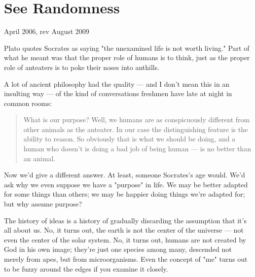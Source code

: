 \chapter{See Randomness}


            
              
                

April 2006, rev August 2009

Plato quotes Socrates
                  as saying "the unexamined life is not worth living." Part of
                  what he meant was that the proper role of humans is to think,
                  just as the proper role of anteaters is to poke their noses
                  into anthills.

A lot of ancient philosophy had the
                  quality --- and I don't mean this in an insulting way
                  --- of the kind of conversations freshmen have late at
                  night in common rooms:
                  \begin{quote}

                    What is our purpose? Well, we humans are as conspicuously
                    different from other animals as the anteater. In our case
                    the distinguishing feature is the ability to reason. So
                    obviously that is what we should be doing, and a human who
                    doesn't is doing a bad job of being human --- is no
                    better than an animal.
                  
\end{quote}

                  Now we'd give a different answer. At least, someone Socrates's
                  age would. We'd ask why we even suppose we have a "purpose" in
                  life. We may be better adapted for some things than others; we
                  may be happier doing things we're adapted for; but why assume
                  purpose?

The history of ideas is a history of
                  gradually discarding the assumption that it's all about us.
                  No, it turns out, the earth is not the center of the universe
                  --- not even the center of the solar system. No, it turns
                  out, humans are not created by God in his own image; they're
                  just one species among many, descended not merely from apes,
                  but from microorganisms. Even the concept of "me" turns out to
                  be fuzzy around the edges if you examine it closely.

